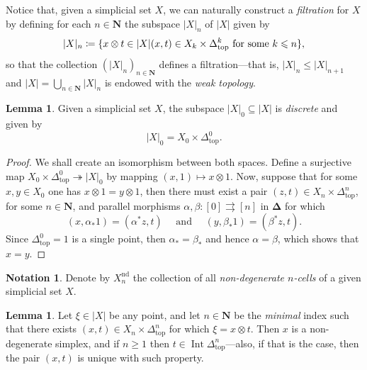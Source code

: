 \documentclass[11pt, reqno]{amsart}
\theoremstyle{definition}
\newtheorem{lemma}[theorem]{Lemma}
\newtheorem{notation}[theorem]{Notation}
\renewcommand{\leq}{\leqslant}
\renewcommand{\geq}{\geqslant}
\let\colon\relax
\newcommand{\epi}{\twoheadrightarrow}
\newcommand{\para}{\rightrightarrows}
\newcommand{\N}{\mathbf{N}}
\newcommand{\Splx}{{\mathbf{\Delta}}}           %
\newcommand{\splxtop}{\Delta_{\text{top}}}
\DeclareMathOperator{\Nondeg}{nd} %
\DeclareMathOperator{\Int}{Int}     %
\begin{document}
Notice that, given a simplicial set \(X\), we can naturally construct a
\emph{filtration} for \(X\) by defining for each \(n \in \N\) the subspace
\(|X|_n\) of \(|X|\) given by
\[
|X|_n \coloneq \{
x \otimes t \in |X| \colon
(x, t) \in X_k \times \splxtop^k
\text{ for some } k \leq n
\},
\]
so that the collection \((|X|_n)_{n \in \N}\) defines a filtration---that is,
\(|X|_n \leq |X|_{n+1}\) and \(|X| = \bigcup_{n \in \N} |X|_n\) is endowed with
the \emph{weak topology}.

\begin{lemma}
\label{lem:X0-simplicial-set-is-discrete}
Given a simplicial set \(X\), the subspace \(|X|_0 \subseteq |X|\) is
\emph{discrete} and given by
\[
|X|_0 = X_0 \times \splxtop^0.
\]
\end{lemma}

\begin{proof}
We shall create an isomorphism between both spaces. Define a surjective map
\(X_0 \times \splxtop^0 \epi |X|_0\) by mapping \((x, 1) \mapsto x \otimes
1\). Now, suppose that for some \(x, y \in X_0\) one has
\(x \otimes 1 = y \otimes 1\), then there must exist a pair
\((z, t) \in X_n \times \splxtop^n\), for some \(n \in \N\), and parallel
morphisms \(\alpha, \beta: [0] \para [n]\) in \(\Splx\) for which
\[
(x, \alpha_{*} 1) = (\alpha^{*} z, t)
\quad \text{ and } \quad
(y, \beta_{*} 1) = (\beta^{*} z, t).
\]
Since \(\splxtop^0 = 1\) is a single point, then \(\alpha_{*} = \beta_{*}\) and
hence \(\alpha = \beta\), which shows that \(x = y\).
\end{proof}

\begin{notation}
\label{not:non-degenerate-cells}
Denote by \(X_n^{\Nondeg}\) the collection of all \emph{non-degenerate
  \(n\)-cells} of a given simplicial set \(X\).
\end{notation}

\begin{lemma}
\label{lem:unique-non-degenerate-point-geometric-realization}
Let \(\xi \in |X|\) be any point, and let \(n \in \N\) be the \emph{minimal}
index such that there exists \((x, t) \in X_n \times \splxtop^n\) for which
\(\xi = x \otimes t\). Then \(x\) is a non-degenerate simplex, and if
\(n \geq 1\) then \(t \in \Int \splxtop^n\)---also, if that is the case, then the
pair \((x, t)\) is unique with such property.
\end{lemma}

\end{document}
